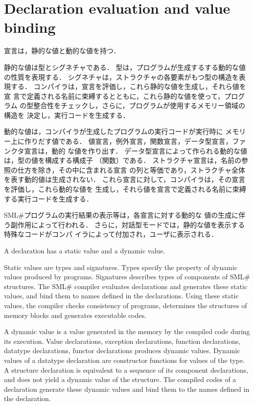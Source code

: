 \documentclass{jbook}
\newcommand{\txt}[2]{#2}
\newcommand{\smlsharp}{SML\#}
\begin{document}
\section{\txt{宣言の評価と値の束縛}{Declaration evaluation and value binding}}

\ifjp%

	宣言は，静的な値と動的な値を持つ．

	静的な値は型とシグネチャである．
	型は，プログラムが生成するする動的な値の性質を表現する．
	シグネチャは，ストラクチャの各要素がもつ型の構造を表現する．
	コンパイラは，宣言を評価し，これら静的な値を生成し，それら値を宣
言で定義される名前に束縛するとともに，これら静的な値を使って，プログラム
の型整合性をチェックし，さらに，プログラムが使用するメモリー領域の構造を
決定し，実行コードを生成する．

	動的な値は，コンパイラが生成したプログラムの実行コードが実行時に
メモリー上に作りだす値である．
	値宣言，例外宣言，関数宣言，データ型宣言，ファンクタ宣言は，動的
な値を作り出す．
	データ型宣言によって作られる動的な値は，型の値を構成する構成子
（関数）である．
	ストラクチャ宣言は，名前の参照の仕方を除き，その中に含まれる宣言
の列と等価であり，ストラクチャ全体を表す動的値は生成されない．
	これら宣言に対して，コンパイラは，その宣言を評価し，これら動的な値を
生成し，それら値を宣言で定義される名前に束縛する実行コードを生成する．

	\smlsharp{}プログラムの実行結果の表示等は，各宣言に対する動的な
値の生成に伴う副作用によって行われる．
	さらに，対話型モードでは，静的な値を表示する特殊なコードがコンパ
イラによって付加され，ユーザに表示される．

\else%

	A declaration has a static value and a dynamic value.

	Static values are types and signatures.
	Types specify the property of dynamic values produced by
programs.
	Signatures describes types of components of \smlsharp{} structures.
	The \smlsharp{} compiler evaluates declarations and generates
these static values, and bind them to names defined in the declarations.
	Using these static values, the compiler checks consistency of
programs, determines the structures of memory blocks and generates
executable codes.

	A dynamic value is a value generated in the memory by the
compiled code during its execution.
	Value declarations, exception declarations, function
declarations, datatype declarations, functor declarations produces
dynamic values.
	Dynamic values of a datatype declaration are constructor
functions for values of the type.
	A structure declaration is equivalent to a sequence of its
component declarations, and does not yield a dynamic value of the
structure.
	The compiled codes of a declaration generate these dynamic
values and bind them to the names defined in the declaration. 
\end{document}
